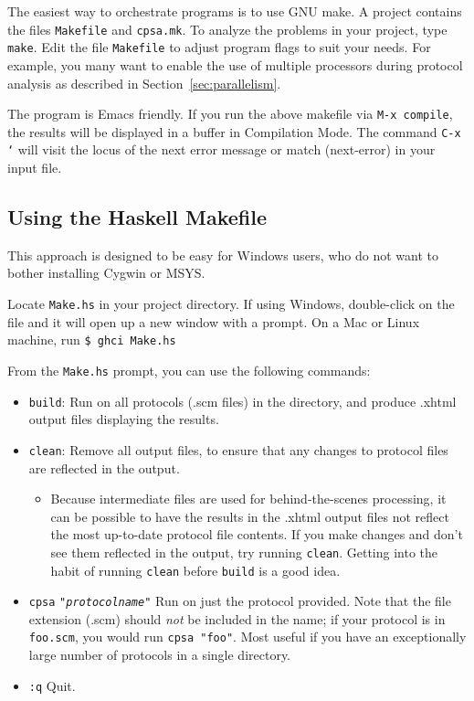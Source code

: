 The easiest way to orchestrate {\cpsa} programs is to use GNU make.  A
{\cpsa} project contains the files \texttt{Makefile} and
\texttt{cpsa.mk}.  To analyze the problems in your project, type
\texttt{make}.  Edit the file \texttt{Makefile} to adjust program
flags to suit your needs.  For example, you many want to enable the
use of multiple processors during protocol analysis as described in
Section~\ref{sec:parallelism}.

The {\cpsa} program is Emacs friendly. If you run the above makefile
via \texttt{M-x compile}, the results will be displayed in a buffer in
Compilation Mode. The command \texttt{C-x `} will visit the locus of
the next error message or match (next-error) in your {\cpsa} input
file.

\subsection{Using the Haskell Makefile}

This approach is designed to be easy for Windows users, who do not want
to bother installing Cygwin or MSYS.

Locate \texttt{Make.hs} in your project directory. If using Windows,
double-click on the file and it will open up a new window with a
prompt. On a Mac or Linux machine, run \texttt{\$ ghci Make.hs}

From the \texttt{Make.hs} prompt, you can use the following commands:

\begin{itemize}
\item \texttt{build}: Run {\cpsa} on all protocols (.scm files) in the
  directory, and produce .xhtml output files displaying the results.
\item \texttt{clean}: Remove all {\cpsa} output files, to ensure that any
  changes to protocol files are reflected in the output.
\begin{itemize}
\item Because intermediate files are used for behind-the-scenes
  processing, it can be possible to have the results in the .xhtml
  output files not reflect the most up-to-date protocol file
  contents. If you make changes and don't see them reflected in the
  output, try running \texttt{clean}. Getting into the habit of
  running \texttt{clean} before \texttt{build} is a good idea.
\end{itemize}
\item \texttt{cpsa} \texttt{"\textit{protocolname}"} Run {\cpsa} on just the
  protocol provided. Note that the file extension (.scm) should
  \textit{not} be included in the name; if your protocol is in
  \texttt{foo.scm}, you would run \texttt{cpsa "foo"}. Most useful if you
  have an exceptionally large number of protocols in a single
  directory.
\item \texttt{:q} Quit.
\end{itemize}

